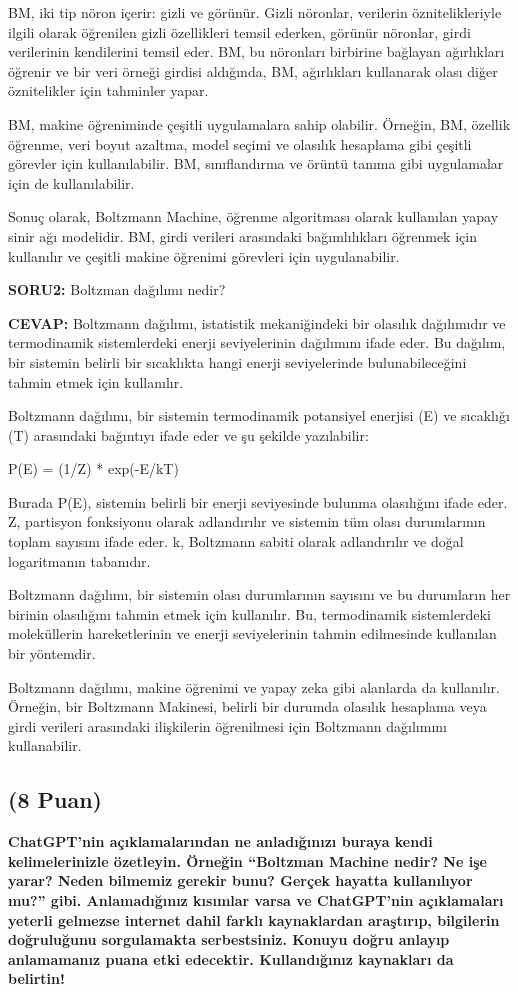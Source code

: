 \documentclass[11pt]{article}
\begin{document}
BM, iki tip nöron içerir: gizli ve görünür. Gizli nöronlar, verilerin öznitelikleriyle ilgili olarak öğrenilen gizli özellikleri temsil ederken, görünür nöronlar, girdi verilerinin kendilerini temsil eder. BM, bu nöronları birbirine bağlayan ağırlıkları öğrenir ve bir veri örneği girdisi aldığında, BM, ağırlıkları kullanarak olası diğer öznitelikler için tahminler yapar.

BM, makine öğreniminde çeşitli uygulamalara sahip olabilir. Örneğin, BM, özellik öğrenme, veri boyut azaltma, model seçimi ve olasılık hesaplama gibi çeşitli görevler için kullanılabilir. BM, sınıflandırma ve örüntü tanıma gibi uygulamalar için de kullanılabilir.

Sonuç olarak, Boltzmann Machine, öğrenme algoritması olarak kullanılan yapay sinir ağı modelidir. BM, girdi verileri arasındaki bağımlılıkları öğrenmek için kullanılır ve çeşitli makine öğrenimi görevleri için uygulanabilir.

\textbf{SORU2:} Boltzman dağılımı nedir?

\textbf{CEVAP:} Boltzmann dağılımı, istatistik mekaniğindeki bir olasılık dağılımıdır ve termodinamik sistemlerdeki enerji seviyelerinin dağılımını ifade eder. Bu dağılım, bir sistemin belirli bir sıcaklıkta hangi enerji seviyelerinde bulunabileceğini tahmin etmek için kullanılır.

Boltzmann dağılımı, bir sistemin termodinamik potansiyel enerjisi (E) ve sıcaklığı (T) arasındaki bağıntıyı ifade eder ve şu şekilde yazılabilir:

P(E) = (1/Z) * exp(-E/kT)

Burada P(E), sistemin belirli bir enerji seviyesinde bulunma olasılığını ifade eder. Z, partisyon fonksiyonu olarak adlandırılır ve sistemin tüm olası durumlarının toplam sayısını ifade eder. k, Boltzmann sabiti olarak adlandırılır ve doğal logaritmanın tabanıdır.

Boltzmann dağılımı, bir sistemin olası durumlarının sayısını ve bu durumların her birinin olasılığını tahmin etmek için kullanılır. Bu, termodinamik sistemlerdeki moleküllerin hareketlerinin ve enerji seviyelerinin tahmin edilmesinde kullanılan bir yöntemdir.

Boltzmann dağılımı, makine öğrenimi ve yapay zeka gibi alanlarda da kullanılır. Örneğin, bir Boltzmann Makinesi, belirli bir durumda olasılık hesaplama veya girdi verileri arasındaki ilişkilerin öğrenilmesi için Boltzmann dağılımını kullanabilir.


\subsection{(8 Puan)} \textbf{ChatGPT’nin açıklamalarından ne anladığınızı buraya kendi kelimelerinizle özetleyin. Örneğin ``Boltzman Machine nedir? Ne işe yarar? Neden bilmemiz gerekir bunu? Gerçek hayatta kullanılıyor mu?'' gibi. Anlamadığınız kısımlar varsa ve ChatGPT’nin açıklamaları yeterli gelmezse internet dahil farklı kaynaklardan araştırıp, bilgilerin doğruluğunu sorgulamakta serbestsiniz. Konuyu doğru anlayıp anlamamanız puana etki edecektir. Kullandığınız kaynakları da belirtin!}
\end{document}
